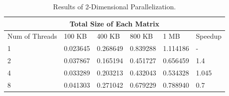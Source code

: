 \documentclass[12pt]{article}
\numberwithin{equation}{section}
\numberwithin{table}{section}
\numberwithin{figure}{section}
\begin{document}
\def\arraystretch{1.3}
\begin{table}
	\centering
	\begin{tabular}{ |p{3cm}||p{2cm}|p{2cm}|p{2cm}|p{2cm}|p{1.5cm}|  }
		
		\hline
		\multicolumn{6}{|c|}{Total Size of Each Matrix} \\
		\hline
	 Num of Threads & 100 KB & 400 KB & 800 KB & 1 MB & Speedup\\
		\hline
		1   & 0.023645 & 0.268649 & 0.839288 & 1.114186 &   -\\
		2   & 0.037867 & 0.165194 & 0.451727 & 0.656459 &   1.4\\
		4   & 0.033289 & 0.203213 & 0.432043 & 0.534328 &   1.045\\
		8   & 0.041303 & 0.271042 & 0.679229 & 0.788940 &   0.7\\
		\hline
	\end{tabular}
	\caption{Results of 2-Dimensional Parallelization.}
	\label{figsolplot}
\end{table}
\end{document}
